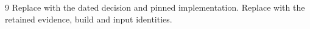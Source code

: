 \begin{thebibliography}{9}
 Replace with the dated decision and pinned implementation.
 Replace with the retained evidence, build and input identities.
\end{thebibliography}

